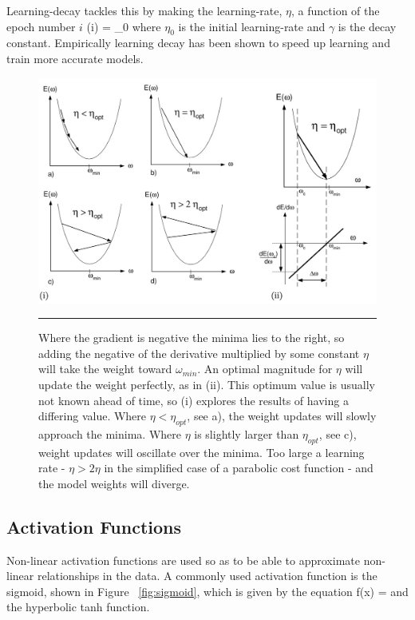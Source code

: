 Learning-decay tackles this by making the learning-rate, $\eta$, a function of the epoch number $i$
\be
\eta(i) = \eta_0 
\ee
where $\eta_0$ is the initial learning-rate and $\gamma$ is the decay constant.
Empirically learning decay has been shown to speed up learning and train more accurate models\citep{bengio2012practical}.
\begin{figure}[htbp]
	\centering
		\includegraphics[width = 1.0\textwidth]{./Figures/efficient_backprop_learning_rate_issues.jpg}
		\rule{35em}{0.5pt}
	\caption[Optimum Learning Rates]{Where the gradient is negative the minima lies to the right, so adding the negative of the derivative multiplied by some constant $\eta$ will take the weight toward $\omega_{min}$. An optimal magnitude for $\eta$ will update the weight perfectly, as in (ii). This optimum value is usually not known ahead of time, so (i) explores the results of having a differing value. Where $\eta < \eta_{opt}$, see a), the weight updates will slowly approach the minima. Where $\eta$ is slightly larger than $\eta_{opt}$, see c), weight updates will oscillate over the minima. Too large a learning rate -  $\eta > 2\eta$ in the simplified case of a parabolic cost function - and the model weights will diverge.}
	\label{fig:Learning_rate_tuning}
\end{figure}


\subsection{Activation Functions}
Non-linear activation functions are used so as to be able to approximate non-linear relationships in the data\citep{bengio2009advances}.
A commonly used activation function is the sigmoid, shown in Figure ~\ref{fig:sigmoid}, which is given by the equation
\be
f(x) = 
\ee
and the hyperbolic tanh function\citep{bengio2009advances}.

